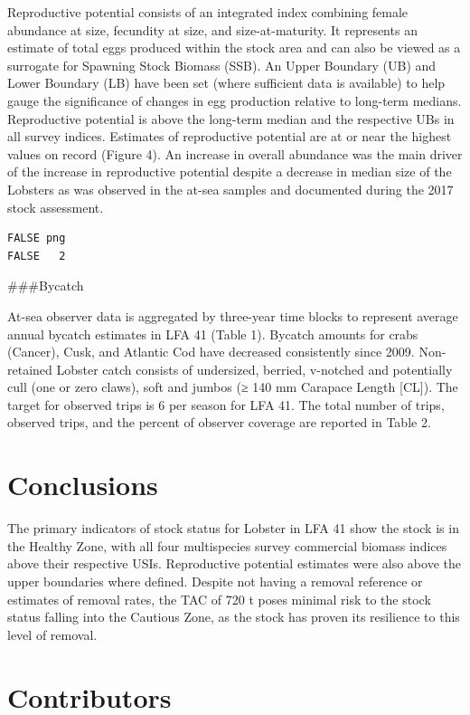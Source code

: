 \documentclass[11pt]{book}
\begin{document}
Reproductive potential consists of an integrated index combining female abundance at size, fecundity at size, and size-at-maturity. It represents an estimate of total eggs produced within the stock area and can also be viewed as a surrogate for Spawning Stock Biomass (SSB). An Upper Boundary (UB) and Lower Boundary (LB) have been set (where sufficient data is available) to help gauge the significance of changes in egg production relative to long-term medians. Reproductive potential is above the long-term median and the respective UBs in all survey indices. Estimates of reproductive potential are at or near the highest values on record (Figure 4). An increase in overall abundance was the main driver of the increase in reproductive potential despite a decrease in median size of the Lobsters as was observed in the at-sea samples and documented during the 2017 stock assessment.
\begin{verbatim}
FALSE png 
FALSE   2
\end{verbatim}
\#\#\#Bycatch

At-sea observer data is aggregated by three-year time blocks to represent average annual bycatch estimates in LFA 41 (Table 1). Bycatch amounts for crabs (Cancer), Cusk, and Atlantic Cod have decreased consistently since 2009. Non-retained Lobster catch consists of undersized, berried, v-notched and potentially cull (one or zero claws), soft and jumbos (≥ 140 mm Carapace Length {[}CL{]}). The target for observed trips is 6 per season for LFA 41. The total number of trips, observed trips, and the percent of observer coverage are reported in Table 2.

\hypertarget{conclusions}{%
\section{Conclusions}\label{conclusions}}

The primary indicators of stock status for Lobster in LFA 41 show the stock is in the Healthy Zone, with all four multispecies survey commercial biomass indices above their respective USIs. Reproductive potential estimates were also above the upper boundaries where defined. Despite not having a removal reference or estimates of removal rates, the TAC of 720 t poses minimal risk to the stock status falling into the Cautious Zone, as the stock has proven its resilience to this level of removal.

\hypertarget{contributors}{%
\section{Contributors}\label{contributors}}
\end{document}
